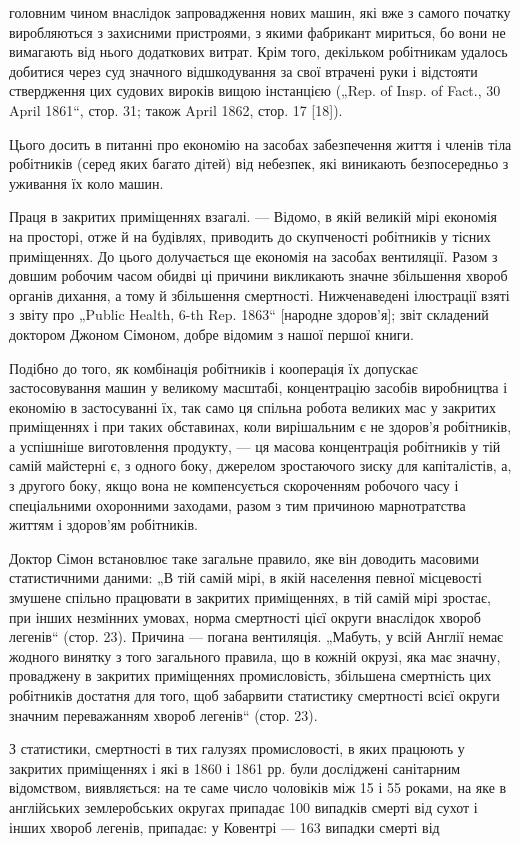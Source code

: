 \parcont{}  %
головним чином внаслідок запровадження нових машин, які вже
з самого початку виробляються з захисними пристроями, з якими
фабрикант мириться, бо вони не вимагають від нього додаткових
витрат. Крім того, декільком робітникам удалось добитися через
суд значного відшкодування за свої втрачені руки і відстояти ствердження цих судових вироків вищою
інстанцією („Rep. of
Insp. of Fact., 30 April 1861“, стор. 31; також April 1862, стор. 17 [18]).

Цього досить в питанні про економію на засобах забезпечення
життя і членів тіла робітників (серед яких багато дітей) від небезпек, які виникають безпосередньо з
уживання їх коло машин.

Праця в закритих приміщеннях взагалі. — Відомо, в якій
великій мірі економія на просторі, отже й на будівлях, приводить до скупченості робітників у тісних
приміщеннях. До цього
долучається ще економія на засобах вентиляції. Разом з довшим
робочим часом обидві ці причини викликають значне збільшення
хвороб органів дихання, а тому й збільшення смертності. Нижченаведені ілюстрації взяті з звіту про
„Public Health, 6-th Rep.
1863“ [народне здоров’я]; звіт складений доктором Джоном
Сімоном, добре відомим з нашої першої книги.

Подібно до того, як комбінація робітників і кооперація їх
допускає застосовування машин у великому масштабі, концентрацію засобів виробництва і економію в
застосуванні їх, так
само ця спільна робота великих мас у закритих приміщеннях
і при таких обставинах, коли вирішальним є не здоров’я робітників, а успішніше виготовлення
продукту, — ця масова концентрація робітників у тій самій майстерні є, з одного боку,
джерелом зростаючого зиску для капіталістів, а, з другого боку,
якщо вона не компенсується скороченням робочого часу і спеціальними охоронними заходами, разом з тим
причиною марнотратства життям і здоров’ям робітників.

Доктор Сімон встановлює таке загальне правило, яке він доводить масовими статистичними даними: „В
тій самій мірі, в якій
населення певної місцевості змушене спільно працювати в закритих приміщеннях, в тій самій мірі
зростає, при інших
незмінних умовах, норма смертності цієї округи внаслідок
хвороб легенів“ (стор. 23). Причина — погана вентиляція. „Мабуть, у всій Англії немає жодного
винятку з того загального
правила, що в кожній окрузі, яка має значну, проваджену
в закритих приміщеннях промисловість, збільшена смертність
цих робітників достатня для того, щоб забарвити статистику
смертності всієї округи значним переважанням хвороб легенів“
(стор. 23).

З статистики, смертності в тих галузях промисловості, в яких
працюють у закритих приміщеннях і які в 1860 і 1861 рр. були
досліджені санітарним відомством, виявляється: на те саме число
чоловіків між 15 і 55 роками, на яке в англійських землеробських округах припадає 100 випадків
смерті від сухот і інших
хвороб легенів, припадає: у Ковентрі — 163 випадки смерті від
\parbreak{}  %

